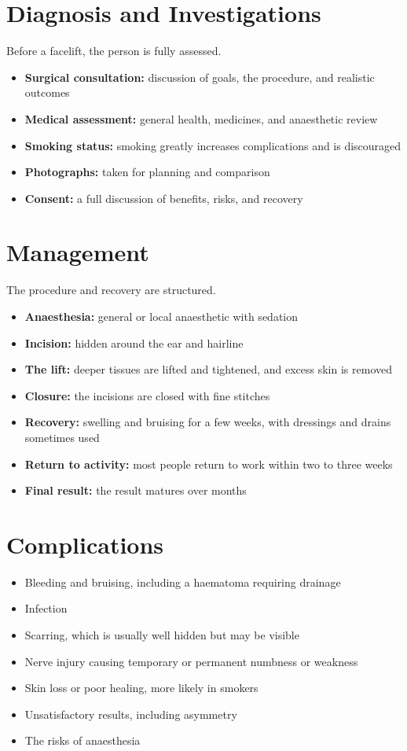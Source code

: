 \section*{Diagnosis and Investigations}
Before a facelift, the person is fully assessed.
\begin{itemize}
    \item \textbf{Surgical consultation:} discussion of goals, the procedure, and realistic outcomes
    \item \textbf{Medical assessment:} general health, medicines, and anaesthetic review
    \item \textbf{Smoking status:} smoking greatly increases complications and is discouraged
    \item \textbf{Photographs:} taken for planning and comparison
    \item \textbf{Consent:} a full discussion of benefits, risks, and recovery
\end{itemize}

\section*{Management}
The procedure and recovery are structured.
\begin{itemize}
    \item \textbf{Anaesthesia:} general or local anaesthetic with sedation
    \item \textbf{Incision:} hidden around the ear and hairline
    \item \textbf{The lift:} deeper tissues are lifted and tightened, and excess skin is removed
    \item \textbf{Closure:} the incisions are closed with fine stitches
    \item \textbf{Recovery:} swelling and bruising for a few weeks, with dressings and drains sometimes used
    \item \textbf{Return to activity:} most people return to work within two to three weeks
    \item \textbf{Final result:} the result matures over months
\end{itemize}

\section*{Complications}
\begin{itemize}
    \item Bleeding and bruising, including a haematoma requiring drainage
    \item Infection
    \item Scarring, which is usually well hidden but may be visible
    \item Nerve injury causing temporary or permanent numbness or weakness
    \item Skin loss or poor healing, more likely in smokers
    \item Unsatisfactory results, including asymmetry
    \item The risks of anaesthesia
\end{itemize}

